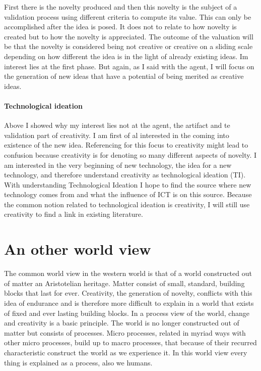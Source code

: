 First there is the novelty produced and then this novelty is the subject of a validation process using different criteria to compute its value.
This can only be accomplished after the idea is posed. It does not to relate to how novelty is created but to how the novelty is appreciated. 
The outcome of the valuation will be that the novelty is considered being not creative or creative on a sliding scale depending on how different the idea is in the light of already existing ideas.
Im interest lies at the first phase. But again, as I said with the agent, I will focus on the generation of new ideas that have a potential of being merited as creative ideas.

\paragraph{Technological ideation}
Above I showed why my interest lies not at the agent, the artifact and te validation part of creativity. I am first of al interested in the coming into existence of the new idea.  
Referencing for this focus to creativity might lead to confusion because creativity is for denoting so many different aspects of novelty. I am interested in the very beginning of new technology, the idea for a new technology, and therefore understand creativity as technological ideation (TI). 
With understanding Technological Ideation I hope to find the source where new technology comes from and what the influence of ICT is on this source.
Because the common notion related to technological ideation is creativity, I will still use creativity to find a link in existing literature. 


\section{An other world view}
The common world view in the western world is that of a world constructed out of matter an Aristotelian heritage. Matter consist of small, standard, building blocks that last for ever. 
Creativity, the generation of novelty, conflicts with this idea of endurance and is therefore more difficult to explain in a world that exists of fixed and ever lasting building blocks.
In a process view of the world, change and creativity is a basic principle. The world is no longer constructed out of matter but consists of processes. Micro processes, related in myriad ways with other micro processes, build up to macro processes, that because of their recurred characteristic construct the world as we experience it. In this world view every thing is explained as a process, also we humans. 


